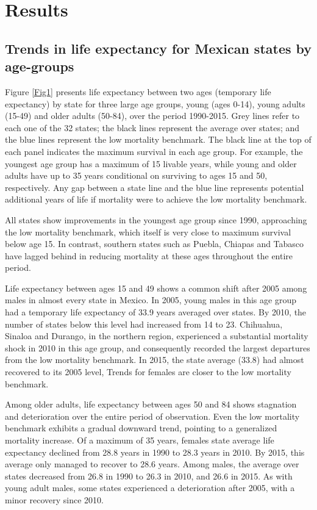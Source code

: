 \documentclass{bmcart}
\begin{document}
\section*{Results}

\subsection*{Trends in life expectancy for Mexican states by age-groups}

Figure \ref{Fig1} presents life expectancy between two ages (temporary life
expectancy) by state  for three large age groups, young (ages 0-14), young
adults (15-49) and older adults (50-84), over the period 1990-2015. Grey lines
refer to each one of the 32 states; the black lines represent the average over
states; and the blue lines represent the low mortality benchmark. The black line
at the top of each panel indicates the maximum survival in each age group. For
example, the youngest age group has a maximum of 15 livable years, while young
and older adults have up to 35 years conditional on surviving to ages 15 and 50,
respectively. Any gap between a state line and the blue line represents potential additional years of life if mortality were to achieve the low mortality benchmark.

All states show improvements in the youngest age group since 1990, approaching the low mortality benchmark, which itself is very close to maximum survival below age 15. In contrast, southern states such as Puebla, Chiapas and Tabasco have lagged behind in reducing mortality at these ages throughout the entire period. 	

Life expectancy between ages 15 and 49 shows a common shift after 2005 among males in almost every state in Mexico. In 2005, young males in this age group had a temporary life expectancy of 33.9 years averaged over states. By 2010, the number of states below this level had increased from 14 to 23. Chihuahua, Sinaloa and Durango, in the northern region, experienced a substantial mortality shock in 2010 in this age group, and consequently recorded the largest departures from the low mortality benchmark. In 2015, the state average (33.8) had almost recovered to its 2005 level,
Trends for females are closer to the low mortality benchmark.

Among older adults, life expectancy between ages 50 and 84 shows stagnation and deterioration over the entire period of observation. Even the low mortality benchmark exhibits a gradual downward trend, pointing to a generalized mortality increase. Of a maximum of 35 years, females state average life expectancy declined from 28.8 years in 1990 to 28.3 years in 2010. By 2015, this average only managed to recover to 28.6 years. Among males, the average over states decreased from 26.8 in 1990 to 26.3 in 2010, and 26.6 in 2015. As with young adult males, some states experienced a deterioration after 2005, with a minor recovery since 2010.\\
\end{document}
